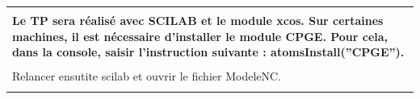 \documentclass[10pt,fleqn]{article} %
\begin{document}
\def\pathfig{images}

\vspace{4.5cm}
\pagestyle{fancy}
\thispagestyle{plain}

\def\columnseprulecolor{\color{ocre}}
\setlength{\columnseprule}{0.4pt} 

\def\pathfig{images}

\begin{center}
\begin{tabular}{|p{.9\linewidth}|}
\hline
\\ \large
\textbf{Le TP sera réalisé avec SCILAB et le module xcos. Sur certaines machines, il est nécessaire d'installer le module CPGE. Pour cela, dans la console, saisir l'instruction suivante : 
atomsInstall(''CPGE'').} \normalsize
 \\
  \\
Relancer ensutite scilab et ouvrir le fichier ModeleNC.
\\
\\ \hline
\end{tabular}
\end{center}
\ifprof
\else
\end{document}
